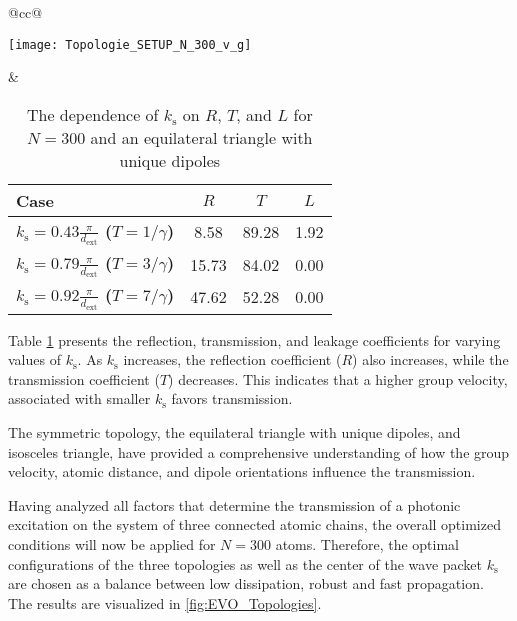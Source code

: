 \begin{table}[h!]
\centering
\caption{The dependence of $ k_\text{s} $ on $R$, $T$, and $L$ for $N = 300$ and an equilateral triangle with unique dipoles}
\begin{tabular}{@{}cc@{}}
    \begin{minipage}{0.22\textwidth}
        \texttt{[image: Topologie\_SETUP\_N\_300\_v\_g]}
    \end{minipage} &
    \begin{minipage}{0.78\textwidth}
        \begin{tabular}{@{}lccc@{}}
        \toprule
        \textbf{Case} & \textbf{$ R $} & \textbf{$ T $} & \textbf{$ L $} \\
        \midrule
        \textbf{$k_\text{s} = 0.43 \frac{\pi}{d_\text{ext}}$ ($T = 1 / \gamma$)} & 8.58 & 89.28 & 1.92 \\
        \textbf{$k_\text{s} = 0.79 \frac{\pi}{d_\text{ext}}$ ($T = 3 / \gamma$)} & 15.73 & 84.02 & 0.00 \\
        \textbf{$k_\text{s} = 0.92 \frac{\pi}{d_\text{ext}}$ ($T = 7 / \gamma$)} & 47.62 & 52.28 & 0.00 \\
        \bottomrule
        \end{tabular}
    \end{minipage}
\end{tabular}
\label{tab:coefficients_k_s}
\end{table}

\noindent
Table \ref{tab:coefficients_k_s} presents the reflection, transmission, and leakage coefficients for varying values of $k_\text{s}$.
As $k_\text{s}$ increases, the reflection coefficient ($R$) also increases, while the transmission coefficient ($T$) decreases.
This indicates that a higher group velocity, associated with smaller $k_\text{s}$ favors transmission.

\vspace{1cm}
\noindent
The symmetric topology, the equilateral triangle with unique dipoles, and isosceles triangle, have provided a comprehensive understanding of how the group velocity, atomic distance, and dipole orientations influence the transmission.

\noindent
Having analyzed all factors
that determine the transmission of a photonic excitation on the system of three connected atomic chains,
the overall optimized conditions will now be applied for $N = 300$ atoms.
Therefore, the optimal configurations of the three topologies
as well as the center of the wave packet $ k_{\text{s}}$ are chosen as a balance between low dissipation, robust and fast propagation.
The results are visualized in \autoref{fig:EVO_Topologies}.

